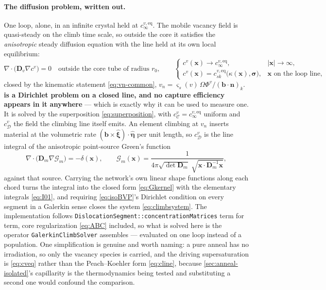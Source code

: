 \documentclass{article}
\newcommand{\bvec}{\bm b}
\newcommand{\nvec}{\bm n}
\newcommand{\Dten}{\bm D}
\newcommand{\code}[1]{\texttt{#1}}
\begin{document}
\paragraph{The diffusion problem, written out.} One loop, alone, in an infinite
crystal held at $c^{v,\mathrm{eq}}_\infty$. The mobile vacancy field is
quasi-steady on the climb time scale, so outside the core it satisfies the
\emph{anisotropic} steady diffusion equation with the line held at its own local
equilibrium:
\begin{equation}
  \nabla\!\cdot\!\bigl(\Dten_v\nabla c^{v}\bigr)=0
  \quad\text{outside the core tube of radius }r_0,
  \qquad
  \begin{cases}
    c^{v}(\bm x)\to c^{v,\mathrm{eq}}_\infty, & |\bm x|\to\infty,\\[2pt]
    c^{v}(\bm x)=c^{v,\mathrm{eq}}_{sk}\bigl(\kappa(\bm x),\bm\sigma\bigr),
      & \bm x\text{ on the loop line},
  \end{cases}
  \label{eq:isoBVP}
\end{equation}
closed by the kinematic statement \cref{eq:vn-common}, $v_n=\varsigma_s(v)\,
\Omega\Phi^{v}/(\bvec\!\cdot\!\nvec)_k$. \textbf{ is a Dirichlet
problem on a closed line, and no capture efficiency appears in it anywhere} ---
which is exactly why it can be used to measure one. It is solved by the
superposition \cref{eq:superposition}, with $c^v_{\mathcal C}=
c^{v,\mathrm{eq}}_\infty$ uniform and $c^v_{\mathcal D}$ the field the climbing
line itself emits. An element climbing at $v_n$ inserts material at the
volumetric rate $(\bvec\times\hat{\bm\xi})\!\cdot\!\hat{\bm\eta}$ per unit length,
so $c^v_{\mathcal D}$ is the line integral of the anisotropic point-source Green's
function
\begin{equation}
  \nabla\!\cdot\!\bigl(\Dten_m\nabla\mathcal G_m\bigr)=-\delta(\bm x),
  \qquad
  \mathcal G_m(\bm x)=\frac{1}
    {4\pi\sqrt{\det\Dten_m}\;\sqrt{\bm x\!\cdot\!\Dten_m^{-1}\bm x}},
  \label{eq:pointsource}
\end{equation}
against that source. Carrying the network's own linear shape functions along each
chord turns the integral into the closed form \cref{eq:Gkernel} with the
elementary integrals \cref{eq:I01}, and requiring \cref{eq:isoBVP}'s Dirichlet
condition on every segment in a Galerkin sense closes the system
\cref{eq:climbsystem}. The implementation follows
\code{DislocationSegment::concentrationMatrices} term for term, core
regularization \cref{eq:ABC} included, so what is solved here is the operator
\code{GalerkinClimbSolver} assembles --- evaluated on one loop instead of a
population. One simplification is genuine and worth naming: a pure anneal has no
irradiation, so only the vacancy species is carried, and the driving
supersaturation is \cref{eq:cveq} rather than the Peach--Koehler form
\cref{eq:cline}, because \cref{sec:anneal-isolated}'s capillarity is the
thermodynamics being tested and substituting a second one would confound the
comparison.
\end{document}
